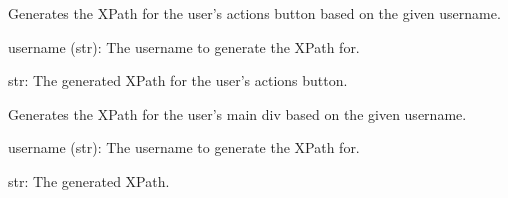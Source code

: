 \documentclass[letterpaper,10pt,english]{sphinxmanual}
\begin{document}

\begin{fulllineitems}
\label{\detokenize{utils:utils.user_management.generate_user_actions_button_xpath}}
\pysigstartsignatures
{}
\pysigstopsignatures
\sphinxAtStartPar
Generates the XPath for the user’s actions button based on the given username.
\begin{description}
\sphinxAtStartPar
username (str): The username to generate the XPath for.

\sphinxAtStartPar
str: The generated XPath for the user’s actions button.

\end{description}

\end{fulllineitems}


\begin{fulllineitems}
\label{\detokenize{utils:utils.user_management.generate_user_xpath}}
\pysigstartsignatures
{}
\pysigstopsignatures
\sphinxAtStartPar
Generates the XPath for the user’s main div based on the given username.
\begin{description}
\sphinxAtStartPar
username (str): The username to generate the XPath for.

\sphinxAtStartPar
str: The generated XPath.

\end{description}

\end{fulllineitems}

\end{document}
